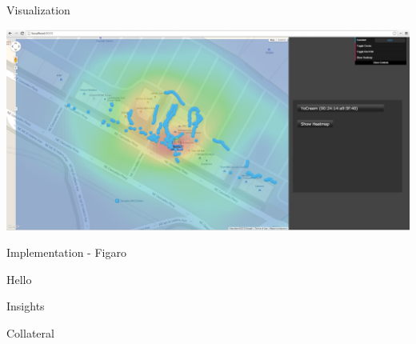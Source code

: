 \documentclass[11pt]{beamer}
\begin{document}
\begin{frame}{Visualization}

\includegraphics[height=0.7\textheight]{pictures/screenshot4.png}
\end{frame}

\begin{frame}{Implementation - Figaro}
\begin{multicols}{2}
\resizebox{!}{1.5in}{
}
\columnbreak

Hello
\end{multicols}

\end{frame}

\begin{frame}{Insights}

\end{frame}

\begin{frame}{Collateral}

\end{frame}
\end{document}
